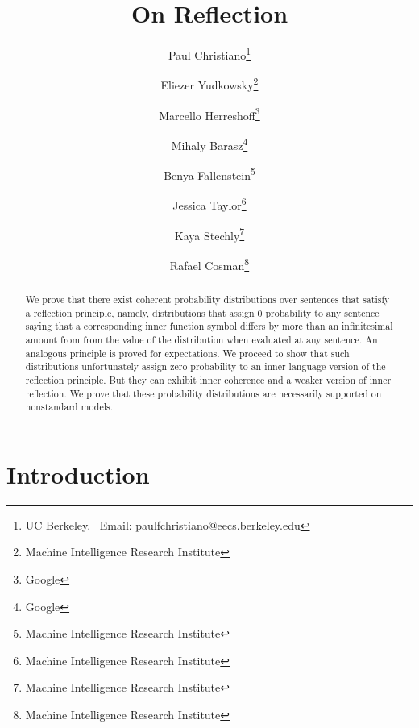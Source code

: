 \documentclass[12pt]{article}
\theoremstyle{plain}
\theoremstyle{definition}
\theoremstyle{remark}
\begin{document}
\title{On Reflection \\ }
\author{
Paul Christiano\thanks{UC Berkeley. \ Email: paulfchristiano@eecs.berkeley.edu}
\and
Eliezer Yudkowsky\thanks{Machine Intelligence Research Institute}
\and
Marcello Herreshoff\thanks{Google}
\and
Mihaly Barasz\thanks{Google}
\and 
Benya Fallenstein\thanks{Machine Intelligence Research Institute}
\and
Jessica Taylor\thanks{Machine Intelligence Research Institute}
\and 
Kaya Stechly\thanks{Machine Intelligence Research Institute}
\and
Rafael Cosman\thanks{Machine Intelligence Research Institute}
}
\maketitle
\begin{abstract}
We prove that there exist coherent probability distributions over sentences that satisfy a reflection principle, namely, distributions that assign 0 probability to any sentence saying that a corresponding inner function symbol differs by more than an infinitesimal amount from from the value of the distribution when evaluated at any sentence. An analogous principle is proved for expectations. We proceed to show that such distributions unfortunately assign zero probability to an inner language version of the reflection principle. But they can exhibit inner coherence and a weaker version of inner reflection. We prove that these probability distributions are necessarily supported on nonstandard models.
\end{abstract}
\setcounter{section}{-1}
\section{Introduction}



\end{document}

